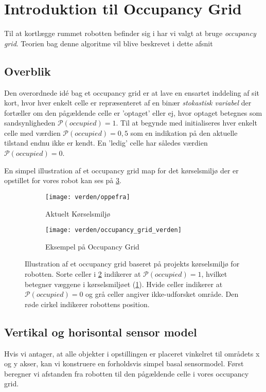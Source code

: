 \section{Introduktion til Occupancy Grid}
Til at kortlægge rummet robotten befinder sig i har vi valgt at bruge \textit{occupancy grid}.
Teorien bag denne algoritme vil blive beskrevet i dette afsnit

\subsection{Overblik}
Den overordnede idé bag et occupancy grid er at lave en ensartet inddeling af sit kort, hvor hver enkelt celle er repræsenteret af en binær \textit{stokastisk variabel } der fortæller om den pågældende celle er 'optaget' eller ej, hvor optaget betegnes som sandsynligheden $\mathcal{P}(occupied) = 1$.
Til at begynde med initialiseres hver enkelt celle med værdien $\mathcal{P}(occupied) = 0,5$ som en indikation på den aktuelle tilstand endnu ikke er kendt.
En 'ledig' celle har således værdien $\mathcal{P}(occupied) = 0$.

En simpel illustration af et occupancy grid map for det kørselsmiljø der er opstillet for vores robot kan ses på \cref{map:approx_occupancy_grid}.

\begin{figure}[h] %
\centering
	\begin{subfigure}[b]{.45\textwidth}
	\centering
	\texttt{[image: verden/oppefra]}
	\caption{Aktuelt Kørselsmiljø}
	\label{map:world}
	\end{subfigure}
	\begin{subfigure}[b]{.45\textwidth}
	\centering
	\texttt{[image: verden/occupancy\_grid\_verden]}
	\caption{Eksempel på Occupancy Grid}
	\label{map:occupancy_grid}
	\end{subfigure}
\caption{Illustration af et occupancy grid baseret på projekts kørselsmiljø for robotten. Sorte celler i \cref{map:occupancy_grid} indikerer at $\mathcal{P}(occupied) = 1$, hvilket betegner væggene i kørselsmiljøet (\cref{map:world}). Hvide celler indikerer at $\mathcal{P}(occupied) = 0$ og grå celler angiver ikke-udforsket område. Den røde cirkel indikerer robottens position.}
\label{map:approx_occupancy_grid}
\end{figure}

\subsection{Vertikal og horisontal sensor model}
Hvis vi antager, at alle objekter i opstillingen er placeret vinkelret til områdets x og y akser,
kan vi konstruere en forholdsvis simpel basal sensormodel.
Først beregner vi afstanden fra robotten til den pågældende celle i vores occupancy grid.

